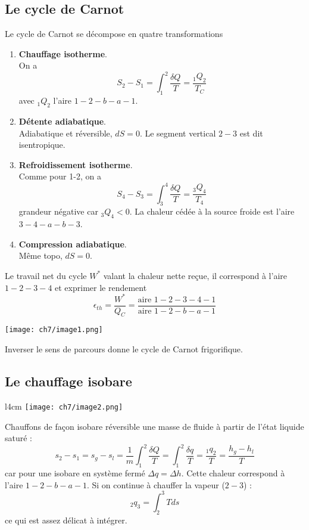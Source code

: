 		\subsection{Le cycle de Carnot}
		Le cycle de Carnot se décompose en quatre transformations
		\begin{enumerate}
		\item \textbf{Chauffage isotherme}.\\
		On a 
		\begin{equation}
		S_2-S_1 = \int_1^2 \dfrac{\delta Q}{T} = \dfrac{_1Q_2}{T_C}
		\end{equation}
		avec $_1Q_2$ l'aire $1-2-b-a-1$.
		\item \textbf{Détente adiabatique}.\\
		Adiabatique et réversible, $dS=0$. Le segment vertical $2-3$ est dit 
		isentropique.
		\item \textbf{Refroidissement isotherme}.\\
		Comme pour 1-2, on a
		\begin{equation}
		S_4-S_3 = \int_3^4 \dfrac{\delta Q}{T} = \dfrac{_3Q_4}{T_4}
		\end{equation}		
		grandeur négative car $_3Q_4<0$. La chaleur cédée à la source froide est 
		l'aire $3-4-a-b-3$.
		\item \textbf{Compression adiabatique}.\\
		Même topo, $dS=0$.
		\end{enumerate}
		Le travail net du cycle $W^*$ valant la chaleur nette reçue, il correspond 
		à l'aire $1-2-3-4$ et exprimer le rendement 
		\begin{equation}
		\epsilon_{th} = \dfrac{W^*}{Q_C} = \frac{\text{aire } 1-2-3-4-1}{\text{aire } 
		1-2-b-a-1}
		\end{equation}
			\begin{center}
	\texttt{[image: ch7/image1.png]}
	\end{center}
		Inverser le sens de parcours donne le cycle de Carnot frigorifique.
		
		\subsection{Le chauffage isobare}
		\begin{wrapfigure}[10]{l}{4cm}
		\vspace{-5mm}
		\texttt{[image: ch7/image2.png]}
		\end{wrapfigure}
		Chauffons de façon isobare réversible une masse de fluide à partir de l'état liquide saturé :	%
		\begin{equation}
		s_2-s_1 = s_g-s_l = \dfrac{1}{m}\int_1^2 \dfrac{\delta Q}{T} = 
		\int_1^2 \frac{\delta q}{T} = \dfrac{_1q_2}{T} = \dfrac{h_g-h_l}{T}
		\end{equation}
		car pour une isobare en système fermé $\Delta q = \Delta h$. Cette chaleur 
		correspond à l'aire $1-2-b-a-1$. Si on continue à chauffer la vapeur ($2-3$) :
		\begin{equation}
		_2q_3 = \int_2^3 Tds
		\end{equation}
		ce qui est assez délicat à intégrer.
	
